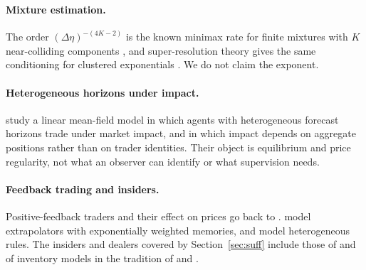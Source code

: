 \documentclass[12pt]{article}
\theoremstyle{definition}
\theoremstyle{remark}
\begin{document}
\paragraph{Mixture estimation.} The order $(\Delta\eta)^{-(4K-2)}$ is the known minimax rate for finite mixtures with $K$ near-colliding components \citep{heinrich2018,wu2020}, and super-resolution theory gives the same conditioning for clustered exponentials \citep{moitra2015,batenkov2021,katz2023}. We do not claim the exponent.

\paragraph{Heterogeneous horizons under impact.} \citet{leclere2026} study a linear mean-field model in which agents with heterogeneous forecast horizons trade under market impact, and in which impact depends on aggregate positions rather than on trader identities. Their object is equilibrium and price regularity, not what an observer can identify or what supervision needs.

\paragraph{Feedback trading and insiders.} Positive-feedback traders and their effect on prices go back to \citet{delong1990}. \citet{barberis2015,barberis2018} model extrapolators with exponentially weighted memories, and \citet{brock1998} model heterogeneous rules. The insiders and dealers covered by Section~\ref{sec:suff} include those of \citet{kyle1985} and of inventory models in the tradition of \citet{hostoll1981} and \citet{grossman1988}.
\end{document}
